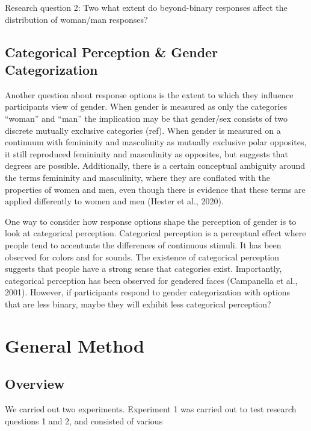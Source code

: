 \documentclass[
  man]{apa7}
\begin{document}
Research question 2: Two what extent do beyond-binary responses affect the distribution of woman/man responses?

\hypertarget{categorical-perception-gender-categorization}{%
\subsection{Categorical Perception \& Gender Categorization}\label{categorical-perception-gender-categorization}}

Another question about response options is the extent to which they influence participants view of gender. When gender is measured as only the categories ``woman'' and ``man'' the implication may be that gender/sex consists of two discrete mutually exclusive categories (ref). When gender is measured on a continuum with femininity and masculinity as mutually exclusive polar opposites, it still reproduced femininity and masculinity as opposites, but suggests that degrees are possible. Additionally, there is a certain conceptual ambiguity around the terms femininity and masculinity, where they are conflated with the properties of women and men, even though there is evidence that these terms are applied differently to women and men (Hester et al., 2020).

One way to consider how response options shape the perception of gender is to look at categorical perception. Categorical perception is a perceptual effect where people tend to accentuate the differences of continuous stimuli. It has been observed for colors and for sounds. The existence of categorical perception suggests that people have a strong sense that categories exist. Importantly, categorical perception has been observed for gendered faces (Campanella et al., 2001). However, if participants respond to gender categorization with options that are less binary, maybe they will exhibit less categorical perception?

\hypertarget{general-method}{%
\section{General Method}\label{general-method}}

\hypertarget{overview}{%
\subsection{Overview}\label{overview}}

We carried out two experiments. Experiment 1 was carried out to test research questions 1 and 2, and consisted of various
\end{document}
